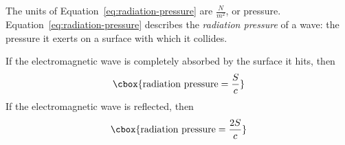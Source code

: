 \documentclass{hw}
\numberwithin{equation}{section}
\begin{document}
The units of Equation~\ref{eq:radiation-pressure} are $\frac{N}{m^2}$, or
pressure. Equation~\ref{eq:radiation-pressure} describes the \emph{radiation
pressure} of a wave: the pressure it exerts on a surface with which it
collides.

If the electromagnetic wave is completely absorbed by the surface it hits, then
\begin{equation}
  \cbox{\text{radiation pressure} = \frac{S}{c}}
\end{equation}
If the electromagnetic wave is reflected, then 
\begin{equation}
  \cbox{\text{radiation pressure} = \frac{2S}{c}}
\end{equation}


\end{document}
